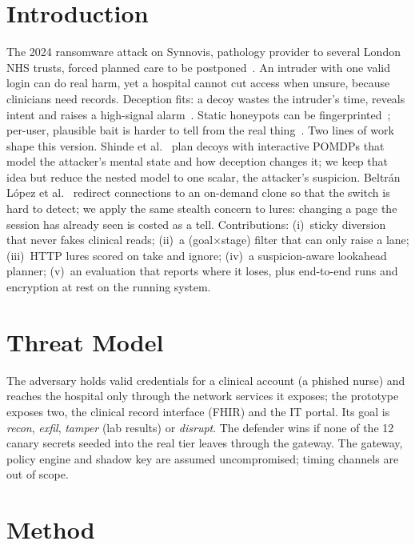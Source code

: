 \documentclass[conference,10pt]{IEEEtran}
\begin{document}
\section{Introduction}
The 2024 ransomware attack on Synnovis, pathology provider to several London NHS trusts, forced
planned care to be postponed~\cite{nhs2024synnovis}. An intruder with one valid login can do real
harm, yet a hospital cannot cut access when unsure, because clinicians need records. Deception
fits: a decoy wastes the intruder's time, reveals intent and raises a high-signal
alarm~\cite{cohen1998deception}. Static honeypots can be
fingerprinted~\cite{holz2005detecting,vetterl2018bitter}; per-user, plausible bait is harder to
tell from the real thing~\cite{bowen2009baiting,juels2013honeywords}. Two lines of work shape this version. Shinde
et al.~\cite{shinde2021active} plan decoys with interactive POMDPs that model the attacker's
mental state and how deception changes it; we keep that idea but reduce the nested model to one
scalar, the attacker's suspicion. Beltr\'an L\'opez et al.~\cite{beltran2024stealth} redirect
connections to an on-demand clone so that the switch is hard to detect; we apply the same
stealth concern to lures: changing a page the session has already seen is costed as a tell.
Contributions: (i)~sticky diversion that never fakes clinical reads; (ii)~a (goal$\times$stage)
filter that can only raise a lane; (iii)~HTTP lures scored on take and ignore; (iv)~a
suspicion-aware lookahead planner; (v)~an evaluation that reports where it loses, plus end-to-end
runs and encryption at rest on the running system.

\section{Threat Model}
The adversary holds valid credentials for a clinical account (a phished nurse) and reaches the
hospital only through the network services it exposes; the prototype exposes two, the clinical
record interface (FHIR) and the IT portal. Its
goal is \emph{recon}, \emph{exfil}, \emph{tamper} (lab results) or \emph{disrupt}. The defender
wins if none of the 12 canary secrets seeded into the real tier leaves through the gateway. The
gateway, policy engine and shadow key are assumed uncompromised; timing channels are out of scope.

\section{Method}
\end{document}
